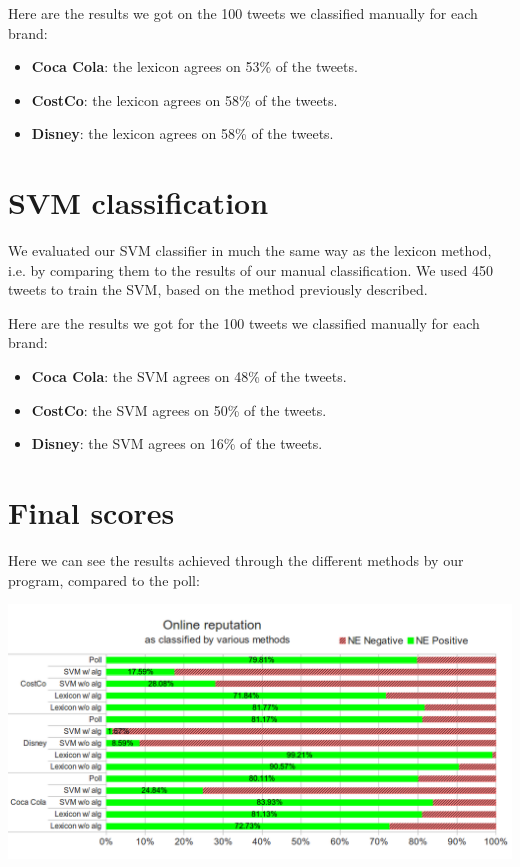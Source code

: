 \documentclass[a4paper,12pt]{report}
\begin{document}
Here are the results we got on the 100 tweets we classified manually for each brand:
\begin{itemize}
        \item \textbf{Coca Cola}: the lexicon agrees on 53\% of the tweets.
        \item \textbf{CostCo}: the lexicon agrees on 58\% of the tweets.
        \item \textbf{Disney}: the lexicon agrees on 58\% of the tweets.
\end{itemize}

\section{SVM classification}

We evaluated our SVM classifier in much the same way as the lexicon method, i.e. by comparing them to the results of our manual classification.
We used 450 tweets to train the SVM, based on the method previously described.

Here are the results we got for the 100 tweets we classified manually for each brand:
\begin{itemize}
        \item \textbf{Coca Cola}: the SVM agrees on 48\% of the tweets.
        \item \textbf{CostCo}: the SVM agrees on 50\% of the tweets.
        \item \textbf{Disney}: the SVM agrees on 16\% of the tweets.
\end{itemize}

\section{Final scores}
Here we can see the results achieved through the different methods by our program, compared to the poll:


\centerline{\includegraphics[scale=0.55]{../img/full1.png}}
\end{document}
